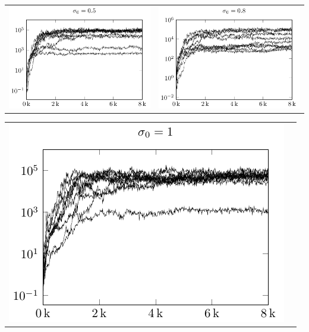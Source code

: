\begin{tabular}{@{}l@{}l@{}}
\includegraphics[scale=1]{plots/cma_initial_sigma_0_5} &
\includegraphics[scale=1]{plots/cma_initial_sigma_0_8}
\end{tabular}

\begin{tabular}{@{}l@{}l@{}}
\includegraphics[scale=1]{plots/cma_initial_sigma_1_0} &
\end{tabular}



